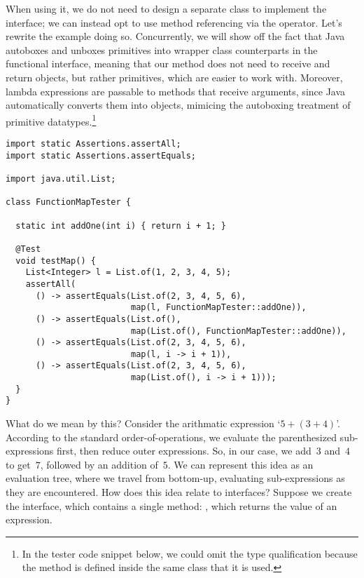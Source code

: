 When using it, we do not need to design a separate  class to implement the interface; we can instead opt to use method referencing via the \ttt{::} operator. 
Let's rewrite the  example doing so. 
Concurrently, we will show off the fact that Java autoboxes and unboxes primitives into wrapper class counterparts in the functional interface, meaning that our  method does not need to receive and return objects, but rather primitives, which are easier to work with. 
Moreover, lambda expressions are passable to methods that receive  arguments, since Java automatically converts them into  objects, mimicing the autoboxing treatment of primitive datatypes.\footnote{In the tester code snippet below, we could omit the  type qualification because the method is defined inside the same class that it is used.}

\begin{lstlisting}[language=MyJava]
import static Assertions.assertAll;
import static Assertions.assertEquals;

import java.util.List;

class FunctionMapTester {

  static int addOne(int i) { return i + 1; }

  @Test
  void testMap() {
    List<Integer> l = List.of(1, 2, 3, 4, 5);
    assertAll(
      () -> assertEquals(List.of(2, 3, 4, 5, 6), 
                         map(l, FunctionMapTester::addOne)),
      () -> assertEquals(List.of(),   
                         map(List.of(), FunctionMapTester::addOne)),
      () -> assertEquals(List.of(2, 3, 4, 5, 6), 
                         map(l, i -> i + 1)),
      () -> assertEquals(List.of(2, 3, 4, 5, 6), 
                         map(List.of(), i -> i + 1)));
  }
}
\end{lstlisting}

What do we mean by this? 
Consider the arithmatic expression `$5 + (3 + 4)$'. 
According to the standard order-of-operations, we evaluate the parenthesized sub-expressions first, then reduce outer expressions. 
So, in our case, we add~$3$ and~$4$ to get~$7$, followed by an addition of~$5$. 
We can represent this idea as an evaluation tree, where we travel from bottom-up, evaluating sub-expressions as they are encountered. 
How does this idea relate to interfaces? 
Suppose we create the  interface, which contains a single method: , which returns the value of an expression.


